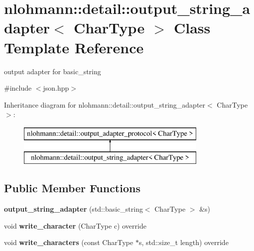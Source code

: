 \hypertarget{classnlohmann_1_1detail_1_1output__string__adapter}{}\section{nlohmann\+:\+:detail\+:\+:output\+\_\+string\+\_\+adapter$<$ Char\+Type $>$ Class Template Reference}
\label{classnlohmann_1_1detail_1_1output__string__adapter}


output adapter for basic\+\_\+string  




{\ttfamily \#include $<$json.\+hpp$>$}

Inheritance diagram for nlohmann\+:\+:detail\+:\+:output\+\_\+string\+\_\+adapter$<$ Char\+Type $>$\+:\begin{figure}[H]
\begin{center}
\leavevmode
\includegraphics[height=2.000000cm]{d2/d39/classnlohmann_1_1detail_1_1output__string__adapter}
\end{center}
\end{figure}
\subsection*{Public Member Functions}
\begin{DoxyCompactItemize}
\item 
\mbox{\label{classnlohmann_1_1detail_1_1output__string__adapter_a2086c9bd140c2ef28775fe190684fd68}} 
{\bfseries output\+\_\+string\+\_\+adapter} (std\+::basic\+\_\+string$<$ Char\+Type $>$ \&s)
\item 
\mbox{\label{classnlohmann_1_1detail_1_1output__string__adapter_ae66b8b2b776acd4fc20bcb24dc7a4fac}} 
void {\bfseries write\+\_\+character} (Char\+Type c) override
\item 
\mbox{\label{classnlohmann_1_1detail_1_1output__string__adapter_ad356f6e878ee105e72e66d18b665f623}} 
void {\bfseries write\+\_\+characters} (const Char\+Type $\ast$s, std\+::size\+\_\+t length) override
\end{DoxyCompactItemize}



